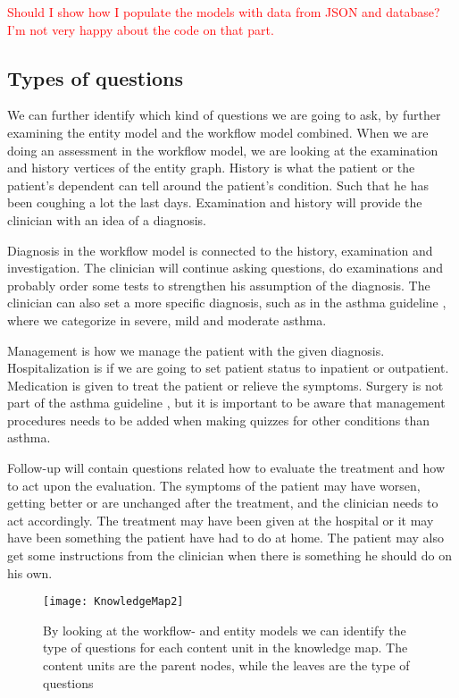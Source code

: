 \textcolor{red}{Should I show how I populate the models with data from JSON and database? I'm not very happy about the code on that part.}


\subsection{Types of questions}
We can further identify which kind of questions we are going to ask, by further examining the entity model and the workflow model combined. When we are doing an assessment in the workflow model, we are looking at the examination and history vertices of the entity graph. History is what the patient or the patient's dependent can tell around the patient's condition. Such that he has been coughing a lot the last days. Examination and history will provide the clinician with an idea of a diagnosis.

Diagnosis in the workflow model is connected to the history, examination and investigation. The clinician will continue asking questions, do examinations and probably order some tests to strengthen his assumption of the diagnosis. The clinician can also set a more specific diagnosis, such as in the asthma guideline \parencite{RepublicofKeny2016}, where we categorize in severe, mild and moderate asthma.

Management is how we manage the patient with the given diagnosis. Hospitalization is if we are going to set patient status to inpatient or outpatient. Medication is given to treat the patient or relieve the symptoms. Surgery is not part of the asthma guideline \parencite{RepublicofKeny2016}, but it is important to be aware that management procedures needs to be added when making quizzes for other conditions than asthma.

Follow-up will contain questions related how to evaluate the treatment and how to act upon the evaluation. The symptoms of the patient may have worsen, getting better or are unchanged after the treatment, and the clinician needs to act accordingly. The treatment may have been given at the hospital or it may have been something the patient have had to do at home. The patient may also get some instructions from the clinician when there is something he should do on his own. 
\begin{figure}[h!]
	\caption {By looking at the workflow- and entity models we can identify the type of questions for each content unit in the knowledge map. The content units are the parent nodes, while the leaves are the type of questions}
	\label{fig:ExpandedKnowledgeMap}
	\texttt{[image: KnowledgeMap2]}
\end{figure}

